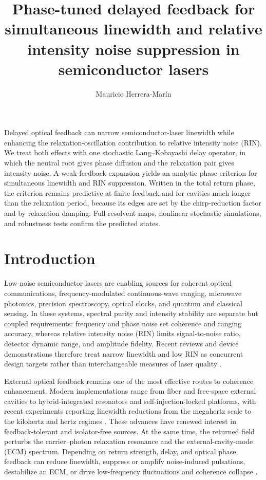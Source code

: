 \documentclass{optica-article}
\newif\ifmarked
\newcommand{\rev}[1]{\ifmarked{\color{blue}#1}\else#1\fi}
\begin{document}
\title{Phase-tuned delayed feedback for simultaneous linewidth and relative intensity noise suppression in semiconductor lasers}

\author{Mauricio Herrera-Mar\'in}
\address{Facultad de Ingenier\'ia, Universidad del Desarrollo, Av. Plaza 680, Las Condes, Santiago, Chile}

\begin{abstract*}
Delayed optical feedback can narrow semiconductor-laser linewidth while enhancing the relaxation-oscillation contribution to relative intensity noise (RIN). \rev{We treat both effects with one stochastic Lang--Kobayashi delay operator, in which the neutral root gives phase diffusion and the relaxation pair gives intensity noise.} A weak-feedback expansion yields an analytic phase criterion for simultaneous linewidth and RIN suppression. \rev{Written in the total return phase, the criterion remains predictive at finite feedback and for cavities much longer than the relaxation period, because its edges are set by the chirp-reduction factor and by relaxation damping. Full-resolvent maps, nonlinear stochastic simulations, and robustness tests confirm the predicted states.}
\end{abstract*}

\section{Introduction}

Low-noise semiconductor lasers are enabling sources for coherent optical communications, frequency-modulated continuous-wave ranging, microwave photonics, precision spectroscopy, optical clocks, and quantum and classical sensing. In these systems, spectral purity and intensity stability are separate but coupled requirements: frequency and phase noise set coherence and ranging accuracy, whereas relative intensity noise (RIN) limits signal-to-noise ratio, detector dynamic range, and amplitude fidelity. Recent reviews and device demonstrations therefore treat narrow linewidth and low RIN as concurrent design targets rather than interchangeable measures of laser quality \cite{WangReview2024,Prokoshin2024,Song2025}.

External optical feedback remains one of the most effective routes to coherence enhancement. Modern implementations range from fiber and free-space external cavities to hybrid-integrated resonators and self-injection-locked platforms, with recent experiments reporting linewidth reductions from the megahertz scale to the kilohertz and hertz regimes \cite{Li2023,Prokoshin2024,Surrow2025}. These advances have renewed interest in feedback-tolerant and isolator-free sources. At the same time, the returned field perturbs the carrier--photon relaxation resonance and the external-cavity-mode (ECM) spectrum. Depending on return strength, delay, and optical phase, feedback can reduce linewidth, suppress or amplify noise-induced pulsations, destabilize an ECM, or drive low-frequency fluctuations and coherence collapse \cite{LangKobayashi1980,Tkach1986,Lenstra1985,Mork1992,Flunkert2007,Ohtsubo2017,RadziunasKane2026}.
\end{document}
